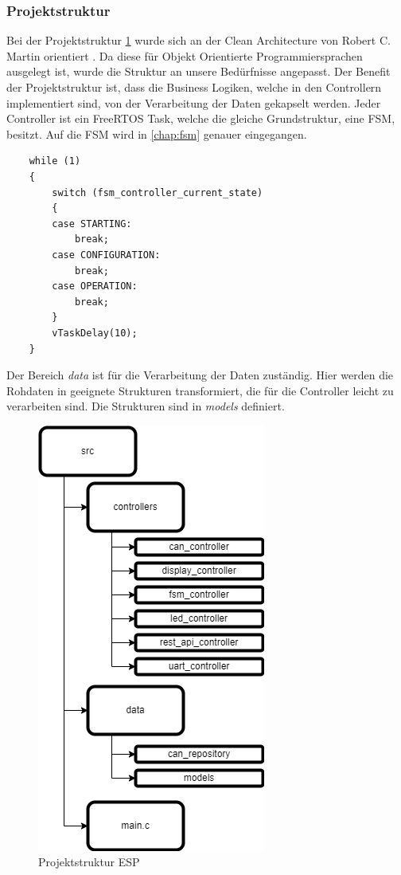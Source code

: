 \subsubsection{Projektstruktur}
Bei der Projektstruktur \ref{fig:projektstruktur_esp} wurde sich an der Clean Architecture von Robert C. Martin orientiert \cite{martin_clean_2018}. Da diese für Objekt Orientierte Programmiersprachen ausgelegt ist, wurde die Struktur an unsere Bedürfnisse angepasst. Der Benefit der Projektstruktur ist, dass die Business Logiken, welche in den Controllern implementiert sind, von der Verarbeitung der Daten gekapselt werden. Jeder Controller ist ein FreeRTOS Task, welche die gleiche Grundstruktur, eine FSM, besitzt. Auf die FSM wird in \ref{chap:fsm} genauer eingegangen.
\begin{lstlisting}
    while (1)
    {
        switch (fsm_controller_current_state)
        {
        case STARTING:
            break;
        case CONFIGURATION:
            break;
        case OPERATION:
            break;
        }
        vTaskDelay(10);
    }
\end{lstlisting}
Der Bereich \textit{data} ist für die Verarbeitung der Daten zuständig. Hier werden die Rohdaten in geeignete Strukturen transformiert, die für die Controller leicht zu verarbeiten sind. Die Strukturen sind in \textit{models} definiert.
\begin{figure}[h]
  \centering
  \includegraphics[height=0.7\textwidth]{img/projektstruktur.png}
  \caption{Projektstruktur ESP}
  \label{fig:projektstruktur_esp}
\end{figure}

